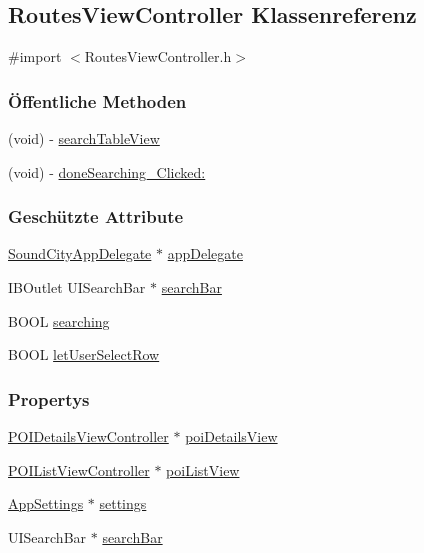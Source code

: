 \hypertarget{interface_routes_view_controller}{
\subsection{RoutesViewController Klassenreferenz}
\label{interface_routes_view_controller}
}


{\ttfamily \#import $<$RoutesViewController.h$>$}\subsubsection*{Öffentliche Methoden}
\begin{DoxyCompactItemize}
\item 
(void) -\/ \hyperlink{interface_routes_view_controller_a2350a9b37e0e6ae0fd8023816c089b23}{searchTableView}
\item 
(void) -\/ \hyperlink{interface_routes_view_controller_a3f068c95509fa343272cdbc12b20148e}{doneSearching\_\-Clicked:}
\end{DoxyCompactItemize}
\subsubsection*{Geschützte Attribute}
\begin{DoxyCompactItemize}
\item 
\hyperlink{interface_sound_city_app_delegate}{SoundCityAppDelegate} $\ast$ \hyperlink{interface_routes_view_controller_ab71ce4b8a535bca29bb855d0613b875a}{appDelegate}
\item 
IBOutlet UISearchBar $\ast$ \hyperlink{interface_routes_view_controller_a761d44bec7a4c60f9b5fd12d18333686}{searchBar}
\item 
BOOL \hyperlink{interface_routes_view_controller_a1d43ad17a11334015dcc2050ffbdeb62}{searching}
\item 
BOOL \hyperlink{interface_routes_view_controller_ac3ac2ed389ab41c8983af66e03ce7fc3}{letUserSelectRow}
\end{DoxyCompactItemize}
\subsubsection*{Propertys}
\begin{DoxyCompactItemize}
\item 
\hyperlink{interface_p_o_i_details_view_controller}{POIDetailsViewController} $\ast$ \hyperlink{interface_routes_view_controller_a9a4b642d1d81169b4286b0cdf6fd88ac}{poiDetailsView}
\item 
\hyperlink{interface_p_o_i_list_view_controller}{POIListViewController} $\ast$ \hyperlink{interface_routes_view_controller_aaa85ec4bf6eacc92d4d5bcbf70e74f14}{poiListView}
\item 
\hyperlink{interface_app_settings}{AppSettings} $\ast$ \hyperlink{interface_routes_view_controller_a573fe62b035ab38208564db3f8d7ba1a}{settings}
\item 
UISearchBar $\ast$ \hyperlink{interface_routes_view_controller_a04efbef6eaed2968767455ff481ee713}{searchBar}
\end{DoxyCompactItemize}


